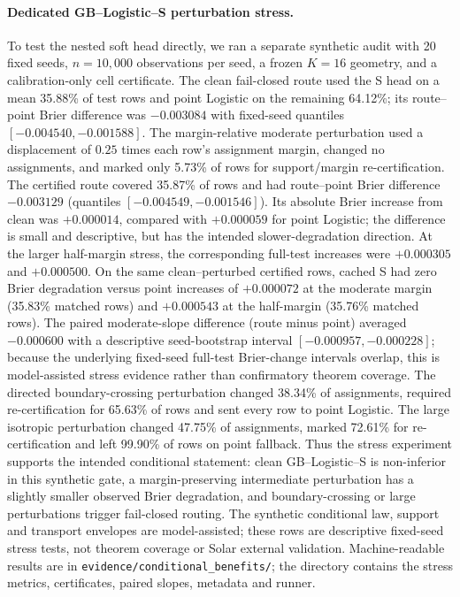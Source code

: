 \documentclass[11pt,a4paper]{article}
\numberwithin{equation}{section}
\theoremstyle{definition}\newtheorem{definition}[theorem]{Definition}
\theoremstyle{remark}\newtheorem{remark}[theorem]{Remark}
\begin{document}
\paragraph{Dedicated GB--Logistic--S perturbation stress.}
To test the nested soft head directly, we ran a separate synthetic audit with 20 fixed seeds, $n=10{,}000$ observations per seed, a frozen $K=16$ geometry, and a calibration-only cell certificate. The clean fail-closed route used the S head on a mean 35.88\% of test rows and point Logistic on the remaining 64.12\%; its route--point Brier difference was $-0.003084$ with fixed-seed quantiles $[-0.004540,-0.001588]$. The margin-relative moderate perturbation used a displacement of $0.25$ times each row's assignment margin, changed no assignments, and marked only 5.73\% of rows for support/margin re-certification. The certified route covered 35.87\% of rows and had route--point Brier difference $-0.003129$ (quantiles $[-0.004549,-0.001546]$). Its absolute Brier increase from clean was $+0.000014$, compared with $+0.000059$ for point Logistic; the difference is small and descriptive, but has the intended slower-degradation direction. At the larger half-margin stress, the corresponding full-test increases were $+0.000305$ and $+0.000500$. On the same clean--perturbed certified rows, cached S had zero Brier degradation versus point increases of $+0.000072$ at the moderate margin (35.83\% matched rows) and $+0.000543$ at the half-margin (35.76\% matched rows). The paired moderate-slope difference (route minus point) averaged $-0.000600$ with a descriptive seed-bootstrap interval $[-0.000957,-0.000228]$; because the underlying fixed-seed full-test Brier-change intervals overlap, this is model-assisted stress evidence rather than confirmatory theorem coverage. The directed boundary-crossing perturbation changed 38.34\% of assignments, required re-certification for 65.63\% of rows and sent every row to point Logistic. The large isotropic perturbation changed 47.75\% of assignments, marked 72.61\% for re-certification and left 99.90\% of rows on point fallback. Thus the stress experiment supports the intended conditional statement: clean GB--Logistic--S is non-inferior in this synthetic gate, a margin-preserving intermediate perturbation has a slightly smaller observed Brier degradation, and boundary-crossing or large perturbations trigger fail-closed routing. The synthetic conditional law, support and transport envelopes are model-assisted; these rows are descriptive fixed-seed stress tests, not theorem coverage or Solar external validation. Machine-readable results are in \texttt{evidence/conditional\_benefits/}; the directory contains the stress metrics, certificates, paired slopes, metadata and runner.
\end{document}
